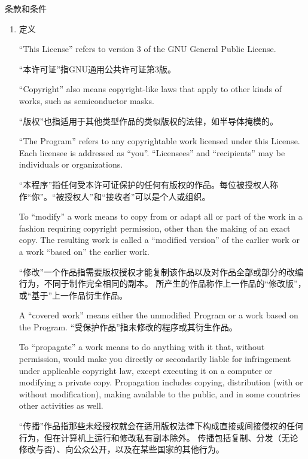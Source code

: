 \documentclass[11pt]{article}
\begin{document}
\begin{center}
  {\Large 条款和条件}
\end{center}


\begin{enumerate}

  \addtocounter{enumi}{-1}

  \item 定义

        ``This License'' refers to version 3 of the GNU General Public License.

        “本许可证”指GNU通用公共许可证第3版。

        ``Copyright'' also means copyright-like laws that apply to other kinds of
        works, such as semiconductor masks.

        “版权”也指适用于其他类型作品的类似版权的法律，如半导体掩模的。

        ``The Program'' refers to any copyrightable work licensed under this
        License.  Each licensee is addressed as ``you''.  ``Licensees'' and
        ``recipients'' may be individuals or organizations.

        “本程序”指任何受本许可证保护的任何有版权的作品。每位被授权人称作“你”。“被授权人”和“接收者”可以是个人或组织。

        To ``modify'' a work means to copy from or adapt all or part of the work
        in a fashion requiring copyright permission, other than the making of an
        exact copy.  The resulting work is called a ``modified version'' of the
        earlier work or a work ``based on'' the earlier work.

        “修改”一个作品指需要版权授权才能复制该作品以及对作品全部或部分的改编行为，不同于制作完全相同的副本。
        所产生的作品称作上一作品的“修改版”，或“基于”上一作品衍生作品。

        A ``covered work'' means either the unmodified Program or a work based
        on the Program.
        “受保护作品”指未修改的程序或其衍生作品。

        To ``propagate'' a work means to do anything with it that, without
        permission, would make you directly or secondarily liable for
        infringement under applicable copyright law, except executing it on a
        computer or modifying a private copy.  Propagation includes copying,
        distribution (with or without modification), making available to the
        public, and in some countries other activities as well.

        “传播”作品指那些未经授权就会在适用版权法律下构成直接或间接侵权的任何行为，但在计算机上运行和修改私有副本除外。
        传播包括复制、分发（无论修改与否）、向公众公开，以及在某些国家的其他行为。


\end{enumerate}
\end{document}
